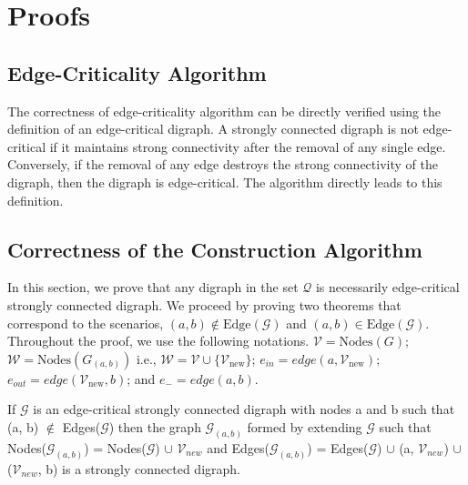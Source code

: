 \documentclass[runningheads]{llncs}
\begin{document}
\section{Proofs}

\subsection{Edge-Criticality Algorithm}
The correctness of edge-criticality algorithm can be directly verified using the definition of an edge-critical digraph. A strongly connected digraph is not edge-critical if it maintains strong connectivity after the removal of any single edge. Conversely, if the removal of any edge destroys the strong connectivity of the digraph, then the digraph is edge-critical. The algorithm directly leads to this definition.

\subsection{Correctness of the Construction Algorithm}
In this section, we prove that any digraph in the set $\mathcal{Q}$ is necessarily edge-critical strongly connected digraph. We proceed by proving two theorems that correspond to  the scenarios, $(a, b) \notin \text{Edge}(\mathcal{G})$ and $(a, b) \in \text{Edge}(\mathcal{G})$. Throughout the proof, we use the following notations. $\mathcal{V} = \text{Nodes}(G)$; $\mathcal{W} = \text{Nodes}(G_{(a,b)})$ i.e., $\mathcal{W} = \mathcal{V} \cup \{\mathcal{V}_{\text{new}}\}$; $e_{in} = edge (a, \mathcal{V}_{\text{new}})$; $e_{out} = edge (\mathcal{V}_{\text{new}}, b)$; and $e_{-} = edge (a, b)$.

\begin{theorem}
If $\mathcal{G}$ is an edge-critical strongly connected digraph with nodes a and b such that (a, b) $\notin$ Edges($\mathcal{G}$) then the graph $\mathcal{G}_{(a,b)}$ formed by extending $\mathcal{G}$ such that Nodes($\mathcal{G}_{(a, b)}$) = Nodes($\mathcal{G}$) $\cup$ $\mathcal{V}_{new}$ and Edges($\mathcal{G}_{(a, b)}$) = Edges($\mathcal{G}$) $\cup$ (a, $\mathcal{V}_{new}$) $\cup$ ($\mathcal{V}_{new}$, b) is a strongly connected digraph.
\end{theorem}
\end{document}

